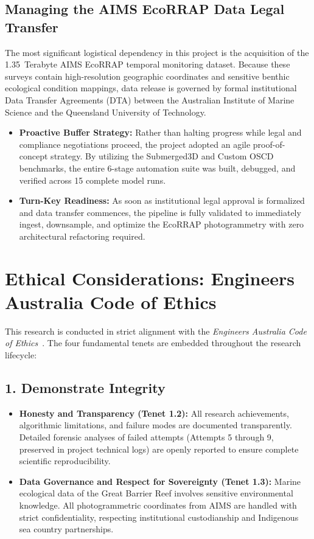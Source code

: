 \subsection{Managing the AIMS EcoRRAP Data Legal Transfer}
The most significant logistical dependency in this project is the acquisition of the 1.35~Terabyte AIMS EcoRRAP temporal monitoring dataset. Because these surveys contain high-resolution geographic coordinates and sensitive benthic ecological condition mappings, data release is governed by formal institutional Data Transfer Agreements (DTA) between the Australian Institute of Marine Science and the Queensland University of Technology.
\begin{itemize}
    \item \textbf{Proactive Buffer Strategy:} Rather than halting progress while legal and compliance negotiations proceed, the project adopted an agile proof-of-concept strategy. By utilizing the Submerged3D and Custom OSCD benchmarks, the entire 6-stage automation suite was built, debugged, and verified across 15 complete model runs.
    \item \textbf{Turn-Key Readiness:} As soon as institutional legal approval is formalized and data transfer commences, the pipeline is fully validated to immediately ingest, downsample, and optimize the EcoRRAP photogrammetry with zero architectural refactoring required.
\end{itemize}

\section{Ethical Considerations: Engineers Australia Code of Ethics}
\label{sec:ethics}
This research is conducted in strict alignment with the \textit{Engineers Australia Code of Ethics}~\cite{EngineersAustralia2019}. The four fundamental tenets are embedded throughout the research lifecycle:

\subsection{1. Demonstrate Integrity}
\begin{itemize}
    \item \textbf{Honesty and Transparency (Tenet 1.2):} All research achievements, algorithmic limitations, and failure modes are documented transparently. Detailed forensic analyses of failed attempts (Attempts 5 through 9, preserved in project technical logs) are openly reported to ensure complete scientific reproducibility.
    \item \textbf{Data Governance and Respect for Sovereignty (Tenet 1.3):} Marine ecological data of the Great Barrier Reef involves sensitive environmental knowledge. All photogrammetric coordinates from AIMS are handled with strict confidentiality, respecting institutional custodianship and Indigenous sea country partnerships.
\end{itemize}

